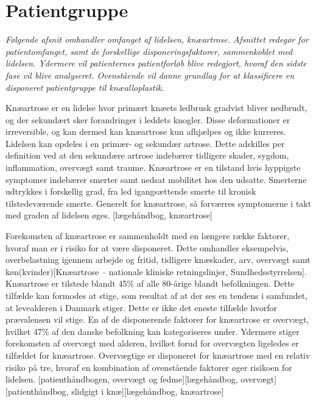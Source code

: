 \section{Patientgruppe}
\textit{Følgende afsnit omhandler omfanget af lidelsen, knæartrose. Afsnittet redegør for patientomfanget, samt de forskellige disponeringsfaktorer, sammenkoblet med lidelsen. Ydermere vil patienternes patientforløb blive redegjort, hvoraf den sidste fase vil blive analyseret. Ovenstående vil danne grundlag for at klassificere en disponeret patientgruppe til knæalloplastik.}

Knæartrose er en lidelse hvor primært knæets ledbrusk gradvist bliver nedbrudt, og der sekundært sker forandringer i leddets knogler. Disse deformationer er irreversible, og kan dermed kan knæartrose kun afhjælpes og ikke kurreres. Lidelsen kan opdeles i en primær- og sekundær artrose. Dette adskilles per definition ved at den sekundære artrose indebærer tidligere skader, sygdom, inflammation, overvægt samt traume. Knæartrose er en tilstand hvis hyppigste symptomer indebærer smerter samt nedsat mobilitet hos den udsatte. Smerterne udtrykkes i forskellig grad, fra led igangsættende smerte til kronisk tilstedeværende smerte. Generelt for knæartrose, så forværres symptomerne i takt med graden af lidelsen øges. [lægehåndbog, knæartrose]

Forekomsten af knæartrose er sammenholdt med en længere række faktorer, hvoraf man er i risiko for at være disponeret. Dette omhandler eksempelvis, overbelastning igennem arbejde og fritid, tidligere knæskader, arv, overvægt samt køn(kvinder)[Knæartrose – nationale kliniske retningslinjer, Sundhedsstyrrelsen]. Knæartrose er tilstede blandt 45\% af alle 80-årige blandt befolkningen. Dette tilfælde kan formodes at stige, som resultat af at der ses en tendens i samfundet, at levealderen i Danmark stiger. Dette er ikke det eneste tilfælde hvorfor prævalensen vil stige. En af de disponerende faktorer for knæartrose er overvægt, hvilket 47\% af den danske befolkning kan kategoriseres under. Ydermere stiger forekomsten af overvægt med alderen, hvilket forud for overvægten ligeledes er tilfældet for knæartrose. Overvægtige er disponeret for knæartrose med en relativ risiko på tre, hvoraf en kombination af ovenstående faktorer øger risikoen for lidelsen. [patienthåndbogen, overvægt og fedme][lægehåndbog, overvægt][patienthåndbog, slidgigt i knæ][lægehåndbog, knæartrose]

